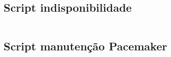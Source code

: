 
\chapter{}
\label{cap:apscripts}

\section{Script indisponibilidade}
\label{ap:scriptindisp}

\begin{lstlisting}[language=bash]


\end{lstlisting}


\section{Script manutenção Pacemaker}
\label{ap:scriptmanutencao}

\begin{lstlisting}[language=bash]


\end{lstlisting}
